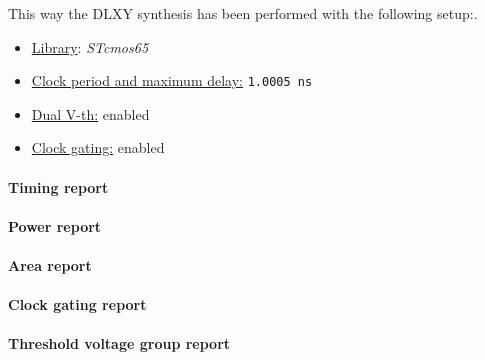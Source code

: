 \bigskip
This way the DLXY synthesis has been performed with the following setup:.
\begin{itemize}
	\item \underline{Library}: \textit{STcmos65}
	\item \underline{Clock period and maximum delay:} \texttt{1.0005 ns}
	\item \underline{Dual V-th:} enabled
	\item \underline{Clock gating:} enabled
\end{itemize}

\paragraph{Timing report}
\paragraph{Power report}
\paragraph{Area report}
\paragraph{Clock gating report}
\paragraph{Threshold voltage group report}

